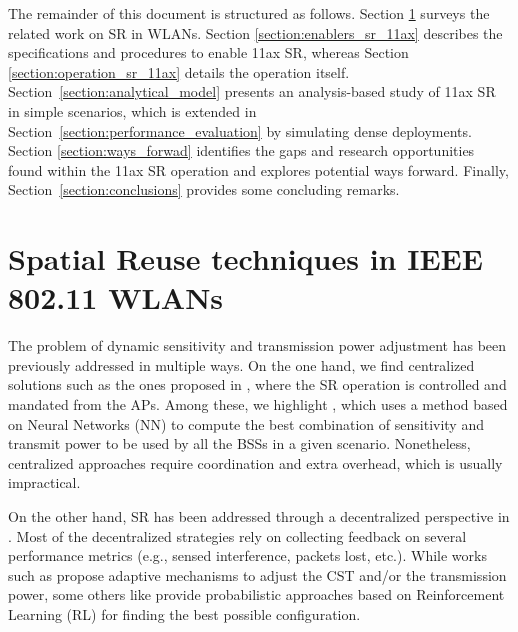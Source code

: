 \documentclass{article}
\begin{document}
The remainder of this document is structured as follows. Section \ref{section:previous_work_sr} surveys the related work on SR in WLANs. Section \ref{section:enablers_sr_11ax} describes the specifications and procedures to enable 11ax SR, whereas Section \ref{section:operation_sr_11ax} details the operation itself. Section~\ref{section:analytical_model} presents an analysis-based study of 11ax SR in simple scenarios, which is extended in Section~\ref{section:performance_evaluation} by simulating dense deployments. Section \ref{section:ways_forwad} identifies the gaps and research opportunities found within the 11ax SR operation and explores potential ways forward. Finally, Section~\ref{section:conclusions} provides some concluding remarks.

\section{Spatial Reuse techniques in IEEE 802.11 WLANs}%
\label{section:previous_work_sr}
 
The problem of dynamic sensitivity and transmission power adjustment has been previously addressed in multiple ways. On the one hand, we find centralized solutions such as the ones proposed in \cite{li2011achieving, jamil2016novel, nakahira2014centralized}, where the SR operation is controlled and mandated from the APs. Among these, we highlight \cite{jamil2016novel}, which uses a method based on Neural Networks (NN) to compute the best combination of sensitivity and transmit power to be used by all the BSSs in a given scenario. Nonetheless, centralized approaches require coordination and extra overhead, which is usually impractical.

On the other hand, SR has been addressed through a decentralized perspective in \cite{chevillat2005dynamic, tang2011improving, chau2017effective, wilhelmi2019collaborative, wilhelmi2019potential}. Most of the decentralized strategies rely on collecting feedback on several performance metrics (e.g., sensed interference, packets lost, etc.). While works such as \cite{chevillat2005dynamic, tang2011improving, chau2017effective} propose adaptive mechanisms to adjust the CST and/or the transmission power, some others like \cite{wilhelmi2019collaborative, wilhelmi2019potential} provide probabilistic approaches based on Reinforcement Learning (RL) for finding the best possible configuration.
\end{document}
